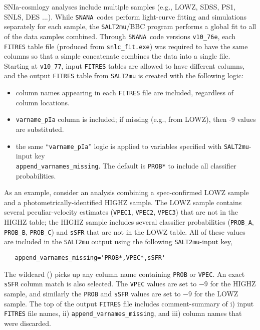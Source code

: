 \documentclass[12pt]{article}
\newcommand{\snana}{{\tt SNANA}}
\begin{document}
SNIa-cosmlogy analyses include multiple samples 
(e.g., LOWZ, SDSS, PS1, SNLS, DES ...). 
While \snana\ codes perform light-curve fitting and simulations
separately for each sample, the {\tt SALT2mu}/BBC program
performs a global fit to all of the data samples combined.
Through \snana\ code versions {\tt v10\_76e}, each {\tt FITRES} table
file (produced from {\tt snlc\_fit.exe}) was required to have the same 
columns so that a simple concatenate combines the data into a single file.
Starting at {\tt v10\_77}, input {\tt FITRES} tables are allowed
to have different columns, and the output {\tt FITRES} table from
{\tt SALT2mu} is created with the following logic:
\begin{itemize}
  \item column names appearing in each {\tt FITRES} file are included,
     regardless of column locations.
  \item {\tt varname\_pIa} column is included; if missing (e.g., from LOWZ),
       then -9 values are substituted.
  \item the same ``{\tt varname\_pIa}'' logic is applied to variables
        specified with {\tt SALT2mu}-input key  \\
        {\tt append\_varnames\_missing}. The default is {\tt PROB*}  to
        include all classifier probabilities.
\end{itemize}
%
As an example, consider an analysis combining a spec-confirmed
LOWZ sample and a photometrically-identified HIGHZ sample.
The LOWZ sample contains several peculiar-velocity estimates
({\tt VPEC1}, {\tt VPEC2}, {\tt VPEC3}) that are not in the HIGHZ table;
the HIGHZ sample includes several classifier probabilities 
({\tt PROB\_A}, {\tt PROB\_B}, {\tt PROB\_C}) and {\tt sSFR} that are not
in the LOWZ table.
All of these values are included in the {\tt SALT2mu} output
using the following {\tt SALT2mu}-input key,
\begin{verbatim}
   append_varnames_missing='PROB*,VPEC*,sSFR'
\end{verbatim} 
The wildcard ({\tt *}) picks up any column name containing
{\tt PROB} or {\tt VPEC}. An exact {\tt sSFR} column match
is also selected.
The {\tt VPEC} values are set to $-9$
for the HIGHZ sample, and similarly the {\tt PROB} and {\tt sSFR}
values are set to $-9$ for the LOWZ sample.
The top of the output {\tt FITRES} file includes comment-summary
of i) input {\tt FITRES} file names, 
ii) {\tt append\_varnames\_missing}, and iii) column names 
that were discarded.
\end{document}

